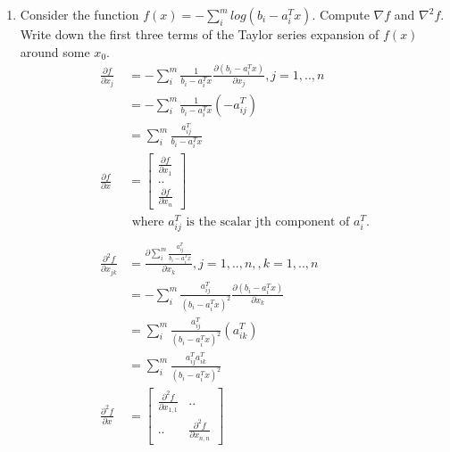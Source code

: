 \documentclass[12pt,letter]{article}
\newcommand{\ppartial}[2]{\frac{\partial #1}{\partial #2}}
\begin{document}


\begin{enumerate}
\item Consider the function $f(x)=-\sum_i^m log(b_i-a_i^Tx)$. Compute $\nabla f$ and $\nabla^2 f$. Write down the first three terms of the Taylor series expansion of $f(x)$ around some $x_0$.\\
  \begin{align*}
    \ppartial{f}{x_j} &= -\sum_i^m \frac{1}{b_i-a_i^T x} \ppartial{(b_i-a_i^Tx)}{x_j}, j=1,..,n\\
                      &= -\sum_i^m \frac{1}{b_i-a_i^T x} (-a_{ij}^T)\\
                      &= \sum_i^m \frac{a_{ij}^T}{b_i-a_i^T x}\\
    \ppartial{f}{x} &=  \begin{bmatrix} \ppartial{f}{x_1} \\ .. \\ \ppartial{f}{x_n} \end{bmatrix}
    \\&\text{ where }a_{ij}^T \text{ is the scalar jth component of }a_i^T.\\
    \\
    \ppartial{^2 f}{x_{jk}} &= \ppartial{\sum_i^m \frac{a_{ij}^T}{b_i-a_i^T x}}{x_k}, j=1,..,n, , k=1,..,n\\
                      &= -\sum_i^m \frac{a_{ij}^T}{(b_i-a_i^T x)^2}\ppartial{(b_i-a_i^T x)}{x_k}\\
                      &= \sum_i^m \frac{a_{ij}^T}{(b_i-a_i^T x)^2}(a_{ik}^T)\\
                      &= \sum_i^m \frac{a_{ij}^Ta_{ik}^T}{(b_i-a_i^T x)^2}\\
    \ppartial{^2 f}{x} &= \begin{bmatrix} \ppartial{^2 f}{x_{1,1}} & .. \\
      .. & \ppartial{^2 f}{x_{n,n}} \end{bmatrix}\\
  \end{align*}

  \pagebreak
  

\end{enumerate}
\end{document}
